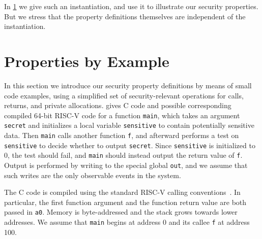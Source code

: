 \documentclass[10pt,conference]{ieeetran}%
\theoremstyle{definition}
\begin{document}
In \cref{sec:example} we give such an instantiation, and
  use it to illustrate our security properties.  But we stress that
  the property definitions themselves are independent of the
  instantiation.


\section{Properties by Example}
\label{sec:example}

In this section we introduce our security property definitions by means
of small code examples, using a simplified set of security-relevant operations for
calls, returns, and private allocations.
 gives C code and possible corresponding compiled 64-bit RISC-V code
for a function {\tt main}, which
takes an argument {\tt secret} and initializes a local variable {\tt sensitive} to contain
potentially sensitive data.
Then {\tt main} calls another function {\tt f},
and afterward performs a test on {\tt sensitive} to decide whether
to output {\tt secret}.  Since {\tt sensitive} is initialized to 0,
the test should fail, and {\tt main} should instead output the return value of {\tt f}.
Output is performed by writing to the special global {\tt out},
and we assume that such writes are the only observable events in the system.

The C code is compiled using the standard RISC-V calling conventions~\cite{RISC-V-CC}.
In particular, the first function argument and the function
return value are both passed in {\tt a0}.
Memory is byte-addressed and the stack grows towards
lower addresses. We assume that {\tt main} begins at address 0 and its callee {\tt f} at address 100.
\end{document}
